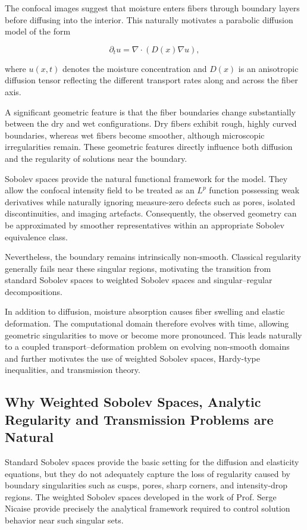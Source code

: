 The confocal images suggest that moisture enters fibers through boundary layers before diffusing into the interior. This naturally motivates a parabolic diffusion model of the form

\[
\partial_t u=\nabla\cdot(D(x)\nabla u),
\]

where $u(x,t)$ denotes the moisture concentration and $D(x)$ is an anisotropic diffusion tensor reflecting the different transport rates along and across the fiber axis.

A significant geometric feature is that the fiber boundaries change substantially between the dry and wet configurations. Dry fibers exhibit rough, highly curved boundaries, whereas wet fibers become smoother, although microscopic irregularities remain. These geometric features directly influence both diffusion and the regularity of solutions near the boundary.

Sobolev spaces provide the natural functional framework for the model. They allow the confocal intensity field to be treated as an $L^p$ function possessing weak derivatives while naturally ignoring measure-zero defects such as pores, isolated discontinuities, and imaging artefacts. Consequently, the observed geometry can be approximated by smoother representatives within an appropriate Sobolev equivalence class.

Nevertheless, the boundary remains intrinsically non-smooth. Classical regularity generally fails near these singular regions, motivating the transition from standard Sobolev spaces to weighted Sobolev spaces and singular--regular decompositions.

In addition to diffusion, moisture absorption causes fiber swelling and elastic deformation. The computational domain therefore evolves with time, allowing geometric singularities to move or become more pronounced. This leads naturally to a coupled transport--deformation problem on evolving non-smooth domains and further motivates the use of weighted Sobolev spaces, Hardy-type inequalities, and transmission theory.

\subsection*{Why Weighted Sobolev Spaces, Analytic Regularity and Transmission Problems are Natural}

Standard Sobolev spaces provide the basic setting for the diffusion and elasticity equations, but they do not adequately capture the loss of regularity caused by boundary singularities such as cusps, pores, sharp corners, and intensity-drop regions. The weighted Sobolev spaces developed in the work of Prof. Serge Nicaise provide precisely the analytical framework required to control solution behavior near such singular sets.

